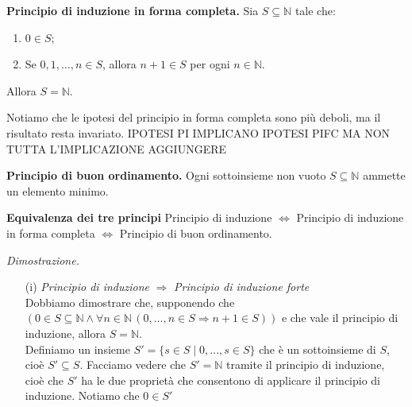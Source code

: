 \begin{definitionbox}
\textbf{Principio di induzione in forma completa.} Sia $S \subseteq \mathbb{N}$ tale che:
\begin{enumerate}[label=(\roman*)]
    \item $0 \in S$;
    \item Se $0,1,\dots,n \in S$, allora $n+1 \in S$ per ogni $n \in \mathbb{N}$.
\end{enumerate}
Allora $S = \mathbb{N}$.
\end{definitionbox}

Notiamo che le ipotesi del principio in forma completa sono  più deboli, ma il risultato resta invariato. IPOTESI PI IMPLICANO IPOTESI PIFC MA NON TUTTA L'IMPLICAZIONE AGGIUNGERE

\begin{definitionbox}
\textbf{Principio di buon ordinamento.} Ogni sottoinsieme non vuoto $S \subseteq \mathbb{N}$ ammette un elemento minimo.
\end{definitionbox}


\begin{theorembox}
\textbf{Equivalenza dei tre principi} \quad
Principio di induzione $\iff$ Principio di induzione in forma completa $\iff$ Principio di buon ordinamento.
\end{theorembox}

\textit{Dimostrazione.} \quad \begin{enumerate}
    \item [(i)]\textit{Principio di induzione} $\Rightarrow$ \textit{Principio di induzione forte} \\ 
    
    Dobbiamo dimostrare che, supponendo che  $\left(0 \in S \subseteq \mathbb{N} \land \forall n \in \mathbb{N} \, (0,...,n \in S \Rightarrow n+1 \in S)\right) $ e che vale il principio di induzione, allora $S=\mathbb{N}$. \\
    Definiamo un insieme $S'=\{s\in S \mid 0,...,s \in S\}$ che è un sottoinsieme di $S$, cioè $S'\subseteq S$. Facciamo vedere che $S'=\mathbb{N}$ tramite il principio di induzione, cioè che $S'$ ha le due proprietà che consentono di applicare il principio di induzione. Notiamo che $0 \in S'$
    
\end{enumerate}
